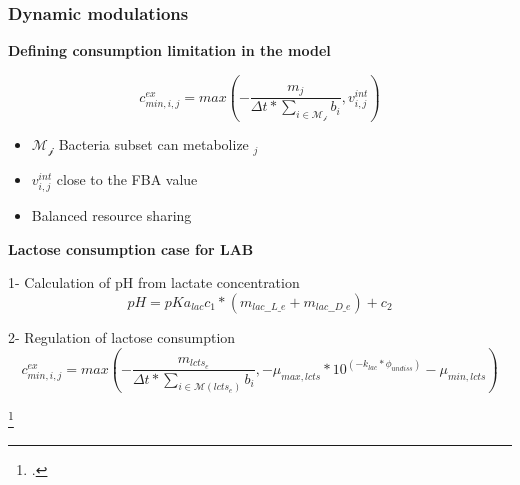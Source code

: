 \documentclass[8pt,usenames,dvipsnames]{beamer}
\begin{document}
\begin{frame}
\frametitle{Dynamic modulations}

\textbf{Defining consumption limitation in the model}

\begin{equation}
c^{ex}_{min,i,j} = max(-\frac{m_{j}}{\Delta t*\sum_{i \in \mathcal{M_j}} b_i}, v^{int}_{i,j})
\end{equation}


\begin{itemize}
\item $\mathcal{M_j}$ Bacteria subset can metabolize $_j$
\item $v^{int}_{i,j}$ close to the FBA value
\item Balanced resource sharing \\
\end{itemize}

\textbf{Lactose consumption case for LAB}

1- Calculation of pH  from lactate concentration\\

\[
pH = pKa_{lac} c_1 * (m_{lac\_\_L\_e}+m_{lac\_\_D\_e})+c_2
\]


2- Regulation of lactose consumption \\
\begin{equation}
c^{ex}_{min,i,j} = max(-\frac{m_{lcts_e}}{\Delta t*\sum_{i \in \mathcal{M}(lcts_e)} b_i},-\mu_{max,lcts}*10^{(-k_{lac}*\phi_{undiss})}-\mu_{min,lcts})
\end{equation}

\footcite{Ozcan.2020}

\end{frame}
\end{document}
